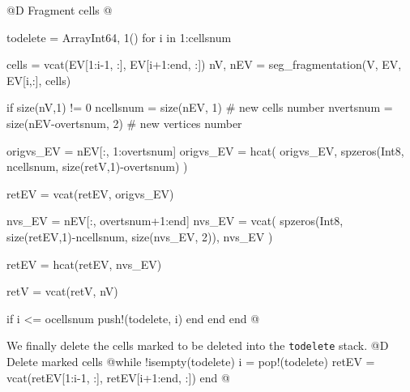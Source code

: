 \documentclass[10pt,oneside]{article}
\begin{document}
@D Fragment cells
@{todelete = Array{Int64, 1}()
for i in 1:cellsnum

    cells = vcat(EV[1:i-1, :], EV[i+1:end, :])
    nV, nEV = seg_fragmentation(V, EV, EV[i,:], cells)

    if size(nV,1) != 0
        ncellsnum = size(nEV, 1) # new cells number
        nvertsnum = size(nEV-overtsnum, 2) # new vertices number

        origvs_EV = nEV[:, 1:overtsnum]
        origvs_EV = hcat(
            origvs_EV,
            spzeros(Int8, ncellsnum, size(retV,1)-overtsnum)
        )
        
        retEV = vcat(retEV, origvs_EV)

        nvs_EV = nEV[:, overtsnum+1:end]
        nvs_EV = vcat(
            spzeros(Int8, size(retEV,1)-ncellsnum, size(nvs_EV, 2)),
            nvs_EV
        )

        retEV = hcat(retEV, nvs_EV)
        
        retV = vcat(retV, nV)

        if i <= ocellsnum
            push!(todelete, i)
        end
    end
end
@}
We finally delete the cells marked to be deleted into the \texttt{todelete} stack.
@D Delete marked cells
@{while !isempty(todelete) 
    i = pop!(todelete)
    retEV = vcat(retEV[1:i-1, :], retEV[i+1:end, :])
end
@}


\end{document}
